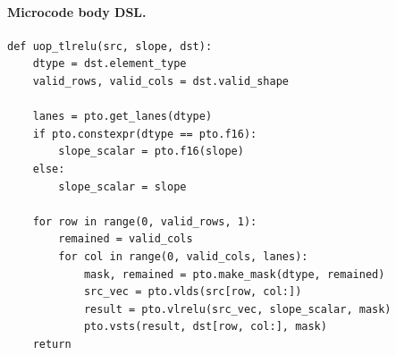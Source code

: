 \paragraph{Microcode body DSL.}
\begin{lstlisting}[style=ptocode]
def uop_tlrelu(src, slope, dst):
    dtype = dst.element_type
    valid_rows, valid_cols = dst.valid_shape

    lanes = pto.get_lanes(dtype)
    if pto.constexpr(dtype == pto.f16):
        slope_scalar = pto.f16(slope)
    else:
        slope_scalar = slope

    for row in range(0, valid_rows, 1):
        remained = valid_cols
        for col in range(0, valid_cols, lanes):
            mask, remained = pto.make_mask(dtype, remained)
            src_vec = pto.vlds(src[row, col:])
            result = pto.vlrelu(src_vec, slope_scalar, mask)
            pto.vsts(result, dst[row, col:], mask)
    return
\end{lstlisting}
\Needspace{0.34\textheight}
